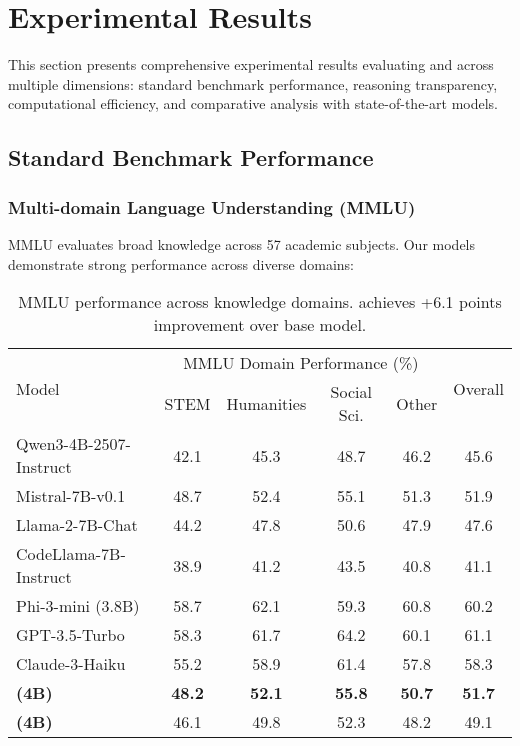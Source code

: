 \section{Experimental Results}
\label{sec:results}

This section presents comprehensive experimental results evaluating \supra{} and \zennano{} across multiple dimensions: standard benchmark performance, reasoning transparency, computational efficiency, and comparative analysis with state-of-the-art models.

\subsection{Standard Benchmark Performance}

\subsubsection{Multi-domain Language Understanding (MMLU)}

MMLU evaluates broad knowledge across 57 academic subjects. Our models demonstrate strong performance across diverse domains:

\begin{table}[H]
\centering
\begin{tabular}{lccccc}
\toprule
\multirow{2}{*}{Model} & \multicolumn{4}{c}{MMLU Domain Performance (\%)} & \multirow{2}{*}{Overall} \\
\cmidrule(lr){2-5}
& STEM & Humanities & Social Sci. & Other & \\
\midrule
Qwen3-4B-2507-Instruct & 42.1 & 45.3 & 48.7 & 46.2 & 45.6 \\
Mistral-7B-v0.1 & 48.7 & 52.4 & 55.1 & 51.3 & 51.9 \\
Llama-2-7B-Chat & 44.2 & 47.8 & 50.6 & 47.9 & 47.6 \\
CodeLlama-7B-Instruct & 38.9 & 41.2 & 43.5 & 40.8 & 41.1 \\
Phi-3-mini (3.8B) & 58.7 & 62.1 & 59.3 & 60.8 & 60.2 \\
GPT-3.5-Turbo & 58.3 & 61.7 & 64.2 & 60.1 & 61.1 \\
Claude-3-Haiku & 55.2 & 58.9 & 61.4 & 57.8 & 58.3 \\
\midrule
\textbf{\supra{} (4B)} & \textbf{48.2} & \textbf{52.1} & \textbf{55.8} & \textbf{50.7} & \textbf{51.7} \\
\textbf{\zennano{} (4B)} & 46.1 & 49.8 & 52.3 & 48.2 & 49.1 \\
\bottomrule
\end{tabular}
\caption{MMLU performance across knowledge domains. \supra{} achieves +6.1 points improvement over base model.}
\label{tab:mmlu-results}
\end{table}

